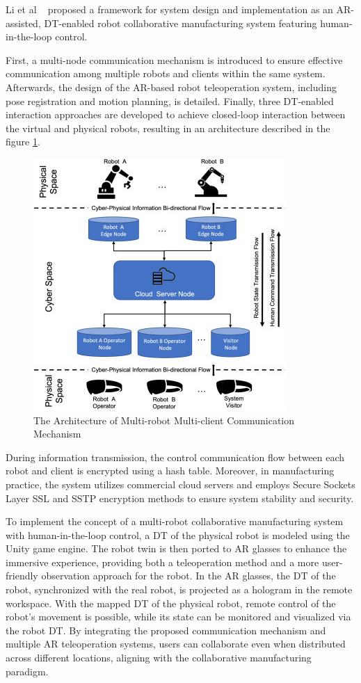 \begin{enumerate}
    Li et al ~\cite{this-article} proposed a framework for system design and implementation as an \ac{AR}-assisted, \ac{DT}-enabled robot collaborative manufacturing system featuring human-in-the-loop control.
    
    First, a multi-node communication mechanism is introduced to ensure effective communication among multiple robots and clients within the same system. Afterwards, the design of the \ac{AR}-based robot teleoperation system, including pose registration and motion planning, is detailed. Finally, three \ac{DT}-enabled interaction approaches are developed to achieve closed-loop interaction between the virtual and physical robots, resulting in an architecture described in the figure \ref{f:system-framework}.

    \begin{figure}[!htpb]
        \centering
        \includegraphics[width=0.5\linewidth]{figs/framework.jpg}
        \caption{The Architecture of Multi-robot Multi-client Communication Mechanism \cite{LI2022102321}}
        \label{f:system-framework}
    \end{figure}

    During information transmission, the control communication flow between each robot and client is encrypted using a hash table. Moreover, in manufacturing practice, the system utilizes commercial cloud servers and employs Secure Sockets Layer \ac{SSL} and \ac{SSTP} encryption methods to ensure system stability and security.

    To implement the concept of a multi-robot collaborative manufacturing system with human-in-the-loop control, a \ac{DT} of the physical robot is modeled using the Unity game engine. The robot twin is then ported to \ac{AR} glasses to enhance the immersive experience, providing both a teleoperation method and a more user-friendly observation approach for the robot. In the \ac{AR} glasses, the \ac{DT} of the robot, synchronized with the real robot, is projected as a hologram in the remote workspace. With the mapped \ac{DT} of the physical robot, remote control of the robot's movement is possible, while its state can be monitored and visualized via the robot \ac{DT}. By integrating the proposed communication mechanism and multiple \ac{AR} teleoperation systems, users can collaborate even when distributed across different locations, aligning with the collaborative manufacturing paradigm.


\end{enumerate}
